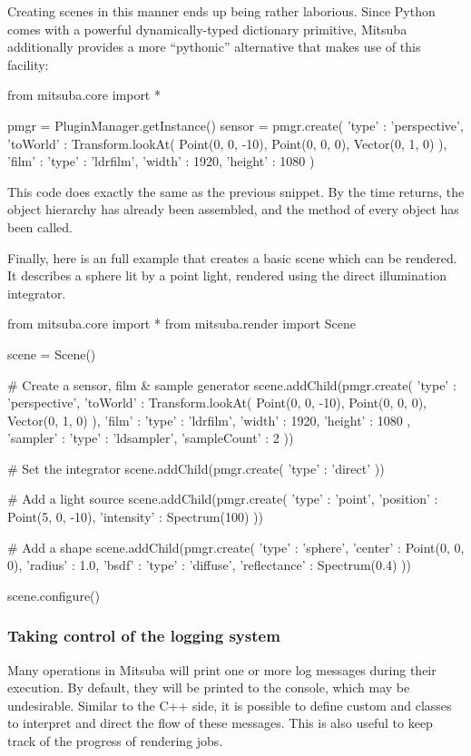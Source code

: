Creating scenes in this manner ends up being rather laborious.
Since Python comes with a powerful dynamically-typed dictionary
primitive, Mitsuba additionally provides a more ``pythonic''
alternative that makes use of this facility:
\begin{python}
from mitsuba.core import *

pmgr = PluginManager.getInstance()
sensor = pmgr.create({
	'type' : 'perspective',
	'toWorld' : Transform.lookAt(
		Point(0, 0, -10),
		Point(0, 0, 0),
		Vector(0, 1, 0)
	),
	'film' : {
		'type' : 'ldrfilm',
		'width' : 1920,
		'height' : 1080
	}
})
\end{python}
This code does exactly the same as the previous snippet.
By the time  returns, the object
hierarchy has already been assembled, and the
 method of every object
has been called.

Finally, here is an full example that creates a basic scene
which can be rendered. It describes a sphere lit by a point
light, rendered using the direct illumination integrator.
\begin{python}
from mitsuba.core import *
from mitsuba.render import Scene

scene = Scene()

# Create a sensor, film & sample generator
scene.addChild(pmgr.create({
	'type' : 'perspective',
	'toWorld' : Transform.lookAt(
		Point(0, 0, -10),
		Point(0, 0, 0),
		Vector(0, 1, 0)
	),
	'film' : {
		'type' : 'ldrfilm',
		'width' : 1920,
		'height' : 1080
	},
	'sampler' : {
		'type' : 'ldsampler',
		'sampleCount' : 2
	}
}))

# Set the integrator
scene.addChild(pmgr.create({
	'type' : 'direct'
}))

# Add a light source
scene.addChild(pmgr.create({
	'type' : 'point',
	'position' : Point(5, 0, -10),
	'intensity' : Spectrum(100)
}))

# Add a shape
scene.addChild(pmgr.create({
	'type' : 'sphere',
	'center' : Point(0, 0, 0),
	'radius' : 1.0,
	'bsdf' : {
		'type' : 'diffuse',
		'reflectance' : Spectrum(0.4)
	}
}))

scene.configure()
\end{python}

\subsubsection{Taking control of the logging system}
Many operations in Mitsuba will print one or more log messages
during their execution. By default, they will be printed to the console,
which may be undesirable. Similar to the C++ side, it is possible to define
custom  and  classes to interpret and direct
the flow of these messages. This is also useful to keep track of the progress
of rendering jobs.

